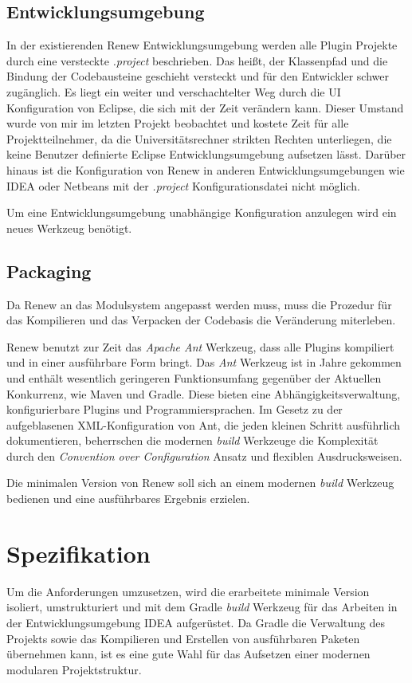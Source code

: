 \subsection{Entwicklungsumgebung} 
	In der existierenden Renew Entwicklungsumgebung werden alle Plugin Projekte durch eine versteckte \textit{.project} beschrieben. Das heißt, der Klassenpfad und die Bindung der Codebausteine geschieht versteckt und für den Entwickler schwer zugänglich. Es liegt ein weiter und verschachtelter Weg durch die UI Konfiguration von Eclipse, die sich mit der Zeit verändern kann. Dieser Umstand wurde von mir im letzten Projekt beobachtet und kostete Zeit für alle Projektteilnehmer, da die Universitätsrechner strikten Rechten unterliegen, die keine Benutzer definierte Eclipse Entwicklungsumgebung aufsetzen lässt. Darüber hinaus ist die Konfiguration von Renew in anderen Entwicklungsumgebungen wie IDEA oder Netbeans mit der \textit{.project} Konfigurationsdatei nicht möglich. \bigbreak

	Um eine Entwicklungsumgebung unabhängige Konfiguration anzulegen wird ein neues Werkzeug benötigt. 

\subsection{Packaging}
	Da Renew an das Modulsystem angepasst werden muss, muss die Prozedur für das Kompilieren  und das Verpacken der Codebasis die Veränderung miterleben.\newline

	Renew benutzt zur Zeit das \textit{Apache Ant} Werkzeug, dass alle Plugins kompiliert und in einer ausführbare Form bringt. Das \textit{Ant} Werkzeug ist in Jahre gekommen und enthält wesentlich geringeren Funktionsumfang gegenüber der Aktuellen Konkurrenz, wie Maven und Gradle. Diese bieten eine Abhängigkeitsverwaltung, konfigurierbare Plugins und Programmiersprachen. Im Gesetz zu der aufgeblasenen XML-Konfiguration von Ant, die jeden kleinen Schritt ausführlich dokumentieren, beherrschen die modernen \textit{build} Werkzeuge die Komplexität durch den \textit{Convention over Configuration} Ansatz und flexiblen Ausdrucksweisen. \bigbreak

	Die minimalen Version von Renew soll sich an einem modernen \textit{build} Werkzeug bedienen und eine ausführbares Ergebnis erzielen.


\section{Spezifikation}
	Um die Anforderungen umzusetzen, wird die erarbeitete minimale Version isoliert, umstrukturiert und mit dem Gradle \textit{build} Werkzeug für das Arbeiten in der Entwicklungsumgebung IDEA aufgerüstet. Da Gradle die Verwaltung des Projekts sowie das Kompilieren und Erstellen von ausführbaren Paketen übernehmen kann, ist es eine gute Wahl für das Aufsetzen einer modernen modularen Projektstruktur.\newline 

